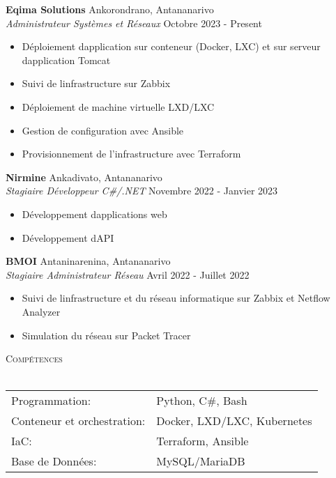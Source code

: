\documentclass[a4paper]{article}
\newcommand{\lineunder} {
    \vspace*{-8pt} \\
    \hspace*{-18pt} \hrulefill \\
}
\newcommand{\header} [1] {
    {\hspace*{-18pt}\vspace*{6pt} \textsc{#1}}
    \vspace*{-6pt} \lineunder
}
\begin{document}
\textbf{Eqima Solutions} \hfill Ankorondrano, Antananarivo\\
\textit{Administrateur Systèmes et Réseaux} \hfill Octobre 2023 - Present\\
\vspace{-1mm}
\begin{itemize} \itemsep 1pt
	\item Déploiement d\textquotesingle{}application sur conteneur (Docker, LXC) et sur serveur d\textquotesingle{}application Tomcat
	\item Suivi de l\textquotesingle{}infrastructure sur Zabbix
	\item Déploiement de machine virtuelle LXD/LXC
	\item Gestion de configuration avec Ansible
	\item Provisionnement de l’infrastructure avec Terraform
\end{itemize}
\textbf{Nirmine} \hfill Ankadivato, Antananarivo\\
\textit{Stagiaire Développeur C\#/.NET} \hfill Novembre 2022 - Janvier 2023\\
\vspace{-1mm}
\begin{itemize} \itemsep 1pt
	\item Développement d\textquotesingle{}applications web
	\item Développement d\textquotesingle{}API
\end{itemize}
\textbf{BMOI} \hfill Antaninarenina, Antananarivo\\
\textit{Stagiaire Administrateur Réseau} \hfill Avril 2022 - Juillet 2022\\
\vspace{-1mm}
\begin{itemize} \itemsep 1pt
	\item Suivi de l\textquotesingle{}infrastructure et du réseau informatique sur Zabbix et Netflow Analyzer
	\item Simulation du réseau sur Packet Tracer
\end{itemize}

\header{Compétences}
\begin{tabular}{ l l }
	Programmation:              & Python, C\#, Bash           \\
	Conteneur et orchestration: & Docker, LXD/LXC, Kubernetes \\
	IaC:                        & Terraform, Ansible          \\
	Base de Données:           & MySQL/MariaDB               \\
\end{tabular}
\vspace{2mm}
\end{document}
